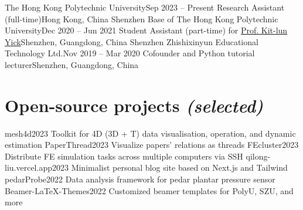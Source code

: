 \documentclass[letterpaper,11pt]{article}
\begin{document}
    \resumeSubHeadingListStart
        \resumeSubheading
            {The Hong Kong Polytechnic University}{Sep 2023 -- Present}
            {Research Assistant (full-time)}{Hong Kong, China}
        \resumeSubheading
            {Shenzhen Base of The Hong Kong Polytechnic University}{Dec 2020 -- Jun 2021}
            {Student Assistant (part-time) for \href{https://research.polyu.edu.hk/en/persons/kit-lun-yick}{Prof. Kit-lun Yick}}{Shenzhen, Guangdong, China}
        \resumeSubheading
            {Shenzhen Zhishixinyun Educational Technology Ltd.}{Nov 2019 -- Mar 2020}
            {Cofounder and Python tutorial lecturer}{Shenzhen, Guangdong, China}
    \resumeSubHeadingListEnd

    \section{Open-source projects \emph{(selected)}}

    \resumeSubHeadingListStart
        \resumeSubheading
            {mesh4d}{2023}
            {Toolkit for 4D (3D + T) data visualisation, operation, and dynamic estimation}{}
        \resumeSubheading
            {PaperThread}{2023}
            {Visualize papers' relations as threads}{}
        \resumeSubheading
            {FEcluster}{2023}
            {Distribute FE simulation tasks across multiple computers via SSH}{}
        \resumeSubheading
            {qilong-liu.vercel.app}{2023}
            {Minimalist personal blog site based on Next.js and Tailwind}{}
        \resumeSubheading
            {pedarProbe}{2022}
            {Data analysis framework for pedar plantar pressure sensor}{}
        \resumeSubheading
            {Beamer-LaTeX-Themes}{2022}
            {Customized beamer templates for PolyU, SZU, and more}{}
    \resumeSubHeadingListEnd
\end{document}
